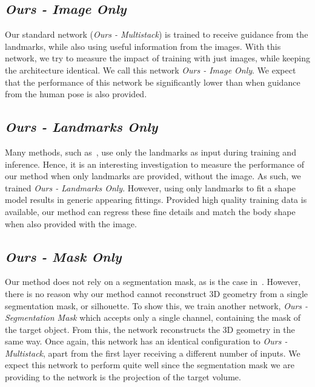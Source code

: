 \subsection{\textit{Ours - Image Only}} %

Our standard network (\textit{Ours - Multistack}) is trained to
receive guidance from the landmarks, while also using useful
information from the images. With this network, we try to measure the
impact of training with just images, while keeping the architecture
identical. We call this network \textit{Ours - Image Only}. We expect
that the performance of this network be significantly lower than when
guidance from the human pose is also provided. 

\subsection{\textit{Ours - Landmarks Only}} %

Many methods, such
as~\cite{bogo2016smplify,ramakrishna2012reconstructing}, use only the
landmarks as input during training and inference. Hence, it is an
interesting investigation to measure the performance of our method
when only landmarks are provided, without the image. As such, we
trained \textit{Ours - Landmarks Only}. However, using only landmarks
to fit a shape model results in generic appearing fittings. Provided
high quality training data is available, our method can regress these
fine details and match the body shape when also provided with the
image.

\subsection{\textit{Ours - Mask Only}}

Our method does not rely on a segmentation mask, as is the case
in~\cite{sigal2008combined}. However, there is no reason why our
method cannot reconstruct 3D geometry from a single segmentation mask,
or silhouette. To show this, we train another network, \textit{Ours -
  Segmentation Mask} which accepts only a single channel, containing
the mask of the target object. From this, the network reconstructs the
3D geometry in the same way. Once again, this network has an identical
configuration to \textit{Ours - Multistack}, apart from the first
layer receiving a different number of inputs. We expect this network
to perform quite well since the segmentation mask we are providing to
the network is the projection of the target volume.

